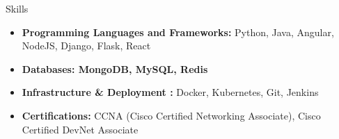 \documentclass[]{mcdowellcv}
\begin{document}
    \makeheader

    \begin{cvsection}{Skills}
        \begin{cvsubsection}{}{}{}
            \begin{itemize}
                \item \textbf {Programming Languages and Frameworks:} Python, Java, Angular, NodeJS, Django, Flask, React
                \item \textbf {Databases: MongoDB, MySQL, Redis} 
                \item \textbf {Infrastructure & Deployment :} Docker, Kubernetes, Git, Jenkins
                \item \textbf {Certifications:} CCNA (Cisco Certified Networking Associate), Cisco Certified DevNet Associate
            \end{itemize}
        \end{cvsubsection}
    \end{cvsection}
\end{document}
